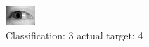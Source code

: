 \begin{figure}[h!]
\begin{center}
\includegraphics[width=0.60\columnwidth]{figures/ID3169_class_3_target_4.png}
\end{center}
\caption{ Classification: 3 actual target: 4}
\label{fig:ID3169_class_3_target_4}
\end{figure}
